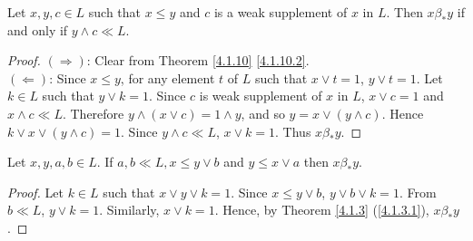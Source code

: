 \documentclass[handout]{beamer}
\begin{document}
\begin{frame}
\begin{corollary}\label{4.1.12}
  Let $ x,y,c \in L $ such that $ x \leq y $ and $ c $ is a weak supplement of $ x $ in $ L $. Then 
  $ x \beta_* y $ if and only if $ y \wedge c \ll L $.
\end{corollary}

\begingroup
{}
\begin{proof}
  $ ( \Rightarrow ) $: 
  Clear from Theorem \ref{4.1.10} \ref{4.1.10.2}. \\
  $ ( \Leftarrow ) $:  
  Since $ x \leq y $, for any element $ t $ of $ L $ such that $ x \vee t = 1 $, $ y \vee t = 1 $. 
  Let $ k \in L $ such that $ y \vee k = 1 $. Since $ c $ is weak supplement of $ x $ in $ L $, 
  $ x \vee c = 1 $ and $ x \wedge c \ll L $. Therefore $ y \wedge ( x \vee c ) = 1 \wedge y $, and so 
  $ y = x \vee ( y \wedge c ) $. Hence $ k \vee x \vee ( y \wedge c ) = 1 $. Since $ y \wedge c \ll L $, 
  $ x \vee k = 1 $. Thus $ x \beta_* y $.
\end{proof}
\endgroup
\end{frame}


\begin{frame}
\begin{theorem}\label{4.1.19}
  Let $x,y,a,b \in L $. If $ a,b \ll L, x \leq y \vee b $ and $ y \leq x \vee a $ then $ x \beta_* y $.
\end{theorem}

\begingroup
{}
\begin{proof}
  Let $ k \in L $ such that $ x \vee y \vee k = 1 $. Since $ x \leq y \vee b $, $ y \vee b \vee k = 1 $. 
  From $ b \ll L $, $ y \vee k = 1 $. Similarly, $ x \vee k = 1 $. 
  Hence, by Theorem \ref{4.1.3} (\ref{4.1.3.1}), $ x \beta_* y $.
\end{proof}
\endgroup
\end{frame}
\end{document}
